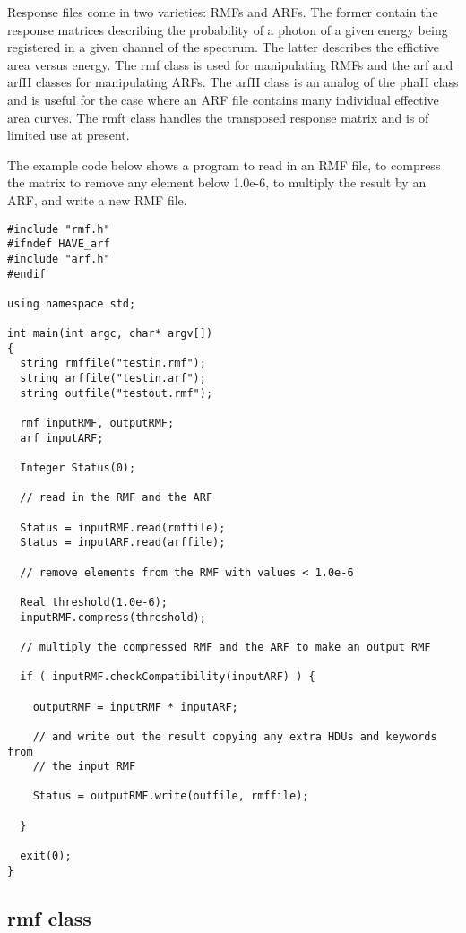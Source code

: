 \documentclass[11pt]{book}
\begin{document}
Response files come in two varieties: RMFs and ARFs. The former
contain the response matrices describing the probability of a photon
of a given energy being registered in a given channel of the
spectrum. The latter describes the effictive area versus energy. The rmf
class is used for manipulating RMFs and the arf and arfII classes for
manipulating ARFs. The arfII class is an analog of the phaII class and
is useful for the case where an ARF file contains many individual
effective area curves. The rmft class handles the transposed response matrix
and is of limited use at present.

The example code below shows a program to read in an RMF file, to
compress the matrix to remove any element below 1.0e-6, to multiply
the result by an ARF, and write a new RMF file.

\begin{verbatim}
#include "rmf.h"
#ifndef HAVE_arf
#include "arf.h"
#endif

using namespace std;

int main(int argc, char* argv[])
{
  string rmffile("testin.rmf");
  string arffile("testin.arf");
  string outfile("testout.rmf");

  rmf inputRMF, outputRMF;
  arf inputARF;

  Integer Status(0);

  // read in the RMF and the ARF

  Status = inputRMF.read(rmffile);
  Status = inputARF.read(arffile);

  // remove elements from the RMF with values < 1.0e-6

  Real threshold(1.0e-6);
  inputRMF.compress(threshold);

  // multiply the compressed RMF and the ARF to make an output RMF

  if ( inputRMF.checkCompatibility(inputARF) ) {

    outputRMF = inputRMF * inputARF;

    // and write out the result copying any extra HDUs and keywords from
    // the input RMF
    
    Status = outputRMF.write(outfile, rmffile);

  }

  exit(0);
}

\end{verbatim}


\subsection{rmf class}
\end{document}
